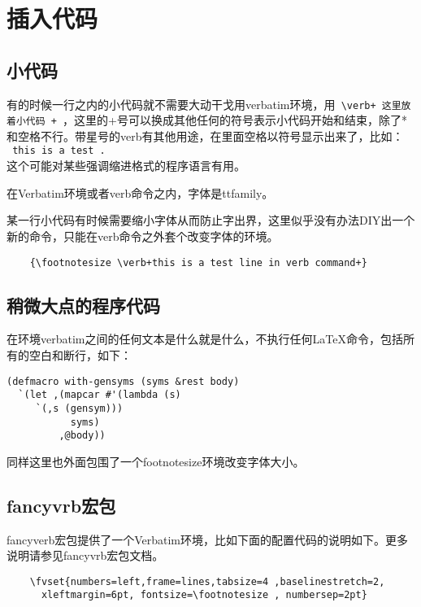 \documentclass[11pt,oneside]{book}
\begin{document}



  \chapter{插入代码}
  \section{小代码}
  有的时候一行之内的小代码就不需要大动干戈用verbatim环境，用\verb| \verb+ 这里放着小代码 + |，这里的+号可以换成其他任何的符号表示小代码开始和结束，除了*和空格不行。带星号的verb有其他用途，在里面空格以符号显示出来了，比如：\\
  \verb*| this is a test . | \\这个可能对某些强调缩进格式的程序语言有用。

  在Verbatim环境或者verb命令之内，字体是ttfamily。

  某一行小代码有时候需要缩小字体从而防止字出界，这里似乎没有办法DIY出一个新的命令，只能在verb命令之外套个改变字体的环境。
  \begin{Verbatim}
    {\footnotesize \verb+this is a test line in verb command+}
  \end{Verbatim}



  \section{稍微大点的程序代码}
  在环境verbatim之间的任何文本是什么就是什么，不执行任何\LaTeX 命令，包括所有的空白和断行，如下：
  \begin{footnotesize}
\begin{verbatim}
(defmacro with-gensyms (syms &rest body)
  `(let ,(mapcar #'(lambda (s)
     `(,s (gensym)))
           syms)
         ,@body))
\end{verbatim}
  \end{footnotesize}
  同样这里也外面包围了一个footnotesize环境改变字体大小。


  \section{fancyvrb宏包}
  fancyverb宏包提供了一个Verbatim环境，比如下面的配置代码的说明如下。更多说明请参见fancyvrb宏包文档。
  \begin{Verbatim}
    \fvset{numbers=left,frame=lines,tabsize=4 ,baselinestretch=2,
      xleftmargin=6pt, fontsize=\footnotesize , numbersep=2pt}
  \end{Verbatim}
\end{document}

